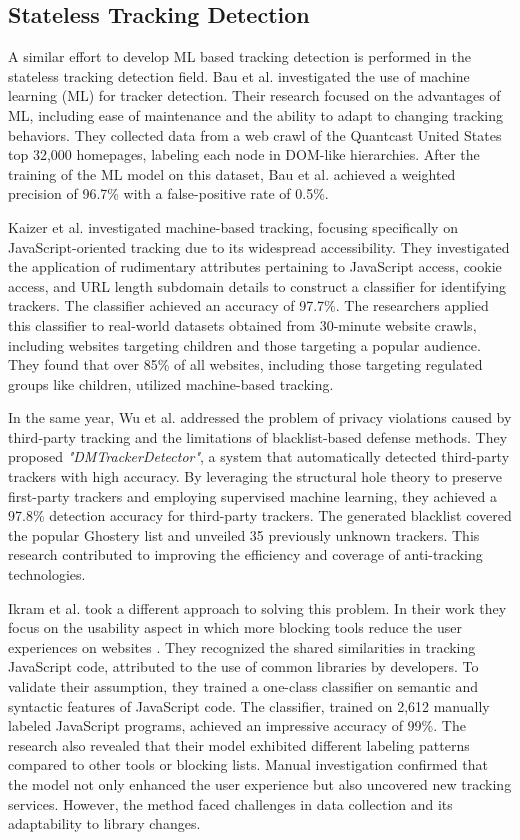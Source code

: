 \subsection{Stateless Tracking Detection}

A similar effort to develop ML based tracking detection is performed in the stateless tracking detection field. Bau et al. \cite{bau2013promising} 
investigated the use of machine learning (ML) for tracker detection. Their research focused on the advantages of ML,
including ease of maintenance and the ability to adapt to changing tracking behaviors. They collected data from a web
crawl of the Quantcast United States top 32,000 homepages, labeling each node in DOM-like hierarchies. After the training of the ML model
on this dataset, Bau et al. achieved a weighted precision of 96.7\% with a false-positive rate of 0.5\%.

Kaizer et al. \cite{kaizer2016towards} investigated machine-based tracking, focusing specifically on JavaScript-oriented tracking due to its widespread
accessibility. They investigated the application of rudimentary attributes pertaining to JavaScript access, cookie access, and URL
length subdomain details to construct a classifier for identifying trackers. The classifier achieved an accuracy of 97.7\%.
The researchers applied this classifier to real-world datasets obtained from 30-minute website crawls, including websites targeting
children and those targeting a popular audience. They found that over 85\% of all websites, including those targeting regulated groups
like children, utilized machine-based tracking.

In the same year, Wu et al. \cite{wu2016machine} addressed the problem of privacy violations caused by third-party tracking and the
limitations of blacklist-based defense methods. They proposed \emph{"DMTrackerDetector"}, a system that automatically detected third-party
trackers with high accuracy. By leveraging the structural hole theory to preserve first-party trackers and employing supervised
machine learning, they achieved a 97.8\% detection accuracy for third-party trackers. The generated blacklist covered the popular
Ghostery \cite{ghostery} list and unveiled 35 previously unknown trackers. This research contributed to improving the efficiency
and coverage of anti-tracking technologies.

Ikram et al. \cite{ikram2016towards} took a different approach to solving this problem. In their work they focus on the usability aspect
in which more blocking tools reduce the user experiences on websites \cite{leon2012johnny}. They recognized the shared similarities in tracking
JavaScript code, attributed to the use of common libraries by developers. To validate their assumption, they trained a one-class
classifier on semantic and syntactic features of JavaScript code. The classifier, trained on 2,612 manually labeled JavaScript
programs, achieved an impressive accuracy of 99\%. The research also
revealed that their model exhibited different labeling patterns compared to other tools or blocking lists. Manual investigation
confirmed that the model not only enhanced the user experience but also uncovered new tracking services. However, the method
faced challenges in data collection and its adaptability to library changes.

